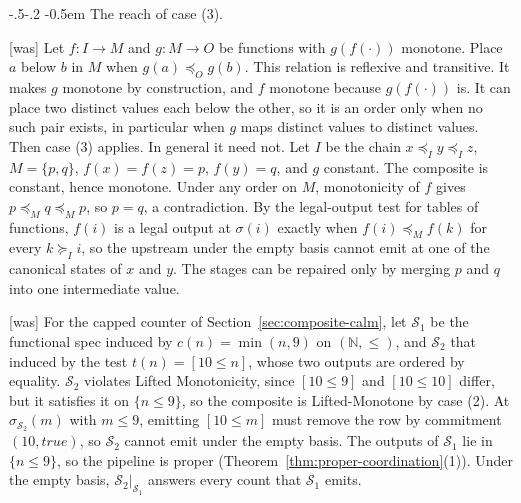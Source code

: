 \documentclass[sigconf]{cidr-2027}
\makeatletter
\theoremstyle{remark}
\renewcommand\paragraph{\@startsection{paragraph}{4}{\z@}%
  {-.5\baselineskip \@plus -2\p@ \@minus -.2\p@}%
  {-0.5em}%
  {\normalfont\bfseries}}
\newcommand{\InputOrd}{\preceq_I}
\newcommand{\OutputOrd}{\preceq_O}
\newcommand{\InputGe}{\succeq_I}
\newcommand{\commitment}{commitment\xspace}
\makeatother
\begin{document}
\paragraph{The reach of case (3).}

{\footnotesize\color{black!50}\noindent\textsf{[was]} Let $f:I\to M$ and $g:M\to O$ be
functions with $g(f(\cdot))$ monotone.  Place $a$ below $b$ in $M$ when
$g(a)\OutputOrd g(b)$.  This relation is reflexive and transitive.  It makes
$g$ monotone by construction, and $f$ monotone because $g(f(\cdot))$ is.  It
can place two distinct values each below the other, so it is an order only
when no such pair exists, in particular when $g$ maps distinct values to
distinct values.  Then case (3) applies.  In general it need not.  Let $I$ be
the chain $x\InputOrd y\InputOrd z$, $M=\{p,q\}$, $f(x)=f(z)=p$, $f(y)=q$, and
$g$ constant.  The composite is constant, hence monotone.  Under any order on
$M$, monotonicity of $f$ gives $p\preceq_M q\preceq_M p$, so $p=q$, a
contradiction.  By the legal-output test for tables of functions, $f(i)$ is
a legal output at $\sigma(i)$ exactly when $f(i)\preceq_M f(k)$ for every
$k\InputGe i$, so the upstream under the empty basis cannot emit at one of the
canonical states of $x$ and $y$.  The stages can be repaired only by merging
$p$ and $q$ into one intermediate value.\par}



{\footnotesize\color{black!50}\noindent\textsf{[was]} For the capped counter of Section~\ref{sec:composite-calm}, let $\mathcal S_1$
be the functional spec induced by $c(n)=\min(n,9)$ on
$(\mathbb N,\le)$, and $\mathcal S_2$ that induced by the test $t(n)=[10\le n]$,
whose two outputs are ordered by equality.  $\mathcal S_2$
violates Lifted Monotonicity, since $[10\le 9]$ and $[10\le 10]$ differ, but it
satisfies it on $\{n\le 9\}$, so the composite is Lifted-Monotone by case (2).  At
$\sigma_{\mathcal S_2}(m)$ with $m\le 9$, emitting $[10\le m]$ must remove the row by \commitment
$(10,\mathit{true})$, so $\mathcal S_2$ cannot emit under the empty basis.
The outputs of $\mathcal S_1$ lie in $\{n\le 9\}$, so the pipeline is proper
(Theorem~\ref{thm:proper-coordination}(1)).  Under the empty basis,
$\mathcal S_2|_{\mathcal S_1}$ answers every count that $\mathcal S_1$ emits.\par}
\end{document}
